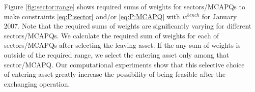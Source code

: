 \documentclass[11pt]{article}
\begin{document}
Figure \ref{fig:sector:range} shows required sums of weights for sectors/MCAPQs to make constraints \eqref{eq:P:sector} and/or \eqref{eq:P:MCAPQ} with $w^{bench}$ for January 2007. Note that the required sums of weights are significantly varying for different sectors/MCAPQs. We calculate the required sum of weights for each of sectors/MCAPQs after selecting the leaving asset. If the any sum of weights is outside of the required range, we select the entering asset only among that sector/MCAPQ. Our computational experiments show that this selective choice of entering asset greatly increase the possibility of being feasible after the exchanging operation.






%
%
%
%
%	
%
%
%
%
\end{document}
